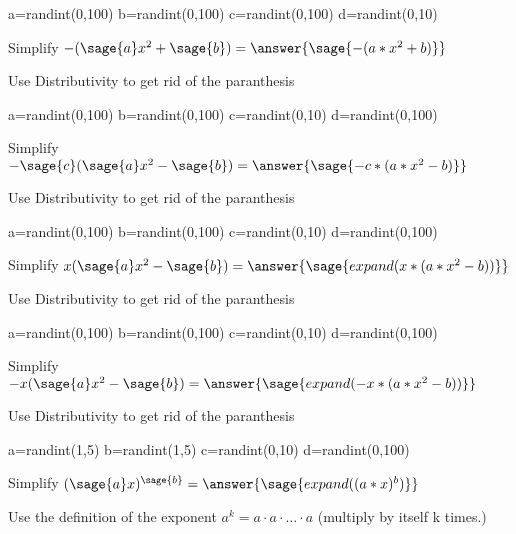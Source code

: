 \documentclass{ximera}
\begin{document}
\begin{problem}
\begin{sagesilent}
a=randint(0,100)
b=randint(0,100)
c=randint(0,100)
d=randint(0,10)
\end{sagesilent}
Simplify $-(\sage{a}x^2+\sage{b})=\answer{\sage{-(a*x^2+b)}}$

\begin{hint}
Use Distributivity to get rid of the paranthesis
\end{hint}

\end{problem}


\begin{problem}
\begin{sagesilent}
a=randint(0,100)
b=randint(0,100)
c=randint(0,10)
d=randint(0,100)
\end{sagesilent}
Simplify $-\sage{c}(\sage{a}x^2-\sage{b})=\answer{\sage{-c*(a*x^2-b)}}$

\begin{hint}
Use Distributivity to get rid of the paranthesis
\end{hint}
\end{problem}


\begin{problem}
\begin{sagesilent}
a=randint(0,100)
b=randint(0,100)
c=randint(0,10)
d=randint(0,100)
\end{sagesilent}
Simplify $x(\sage{a}x^2-\sage{b})=\answer{\sage{expand(x*(a*x^2-b))}}$

\begin{hint}
Use Distributivity to get rid of the paranthesis
\end{hint}
\end{problem}

\begin{problem}
\begin{sagesilent}
a=randint(0,100)
b=randint(0,100)
c=randint(0,10)
d=randint(0,100)
\end{sagesilent}
Simplify $-x(\sage{a}x^2-\sage{b})=\answer{\sage{expand(-x*(a*x^2-b))}}$

\begin{hint}
Use Distributivity to get rid of the paranthesis
\end{hint}
\end{problem}


\begin{problem}
\begin{sagesilent}
a=randint(1,5)
b=randint(1,5)
c=randint(0,10)
d=randint(0,100)
\end{sagesilent}
Simplify $(\sage{a}x)^{\sage{b}}=\answer{\sage{expand((a*x)^b)}}$

\begin{hint}
Use the definition of the exponent $a^k=a\cdot a\cdot \ldots \cdot a$ (multiply by itself k times.)
\end{hint}
\end{problem}
\end{document}
